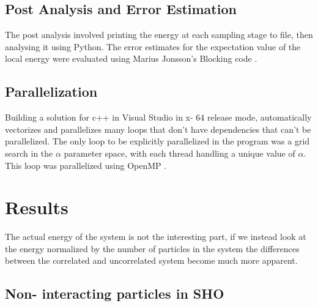 \documentclass[11pt,a4paper,titlepage]{article}
\begin{document}
\subsection{Post Analysis and Error Estimation}
The post analysis involved printing the energy at each sampling stage to file, then analysing it using Python. The error estimates for the expectation value of the local energy were evaluated using Marius Jonsson's Blocking code \cite{PhysRevE.98.043304}.
\subsection{Parallelization}
Building a solution for c++ in Visual Studio in x- 64 release mode, automatically vectorizes and parallelizes many loops that don't have dependencies that can't be parallelized. The only loop to be explicitly parallelized in the program was a grid search in the $\alpha$ parameter space, with each thread handling a unique value of $\alpha$. This loop was parallelized using OpenMP \cite{openmp08}.
\section{Results}
The actual energy of the system is not the interesting part, if we instead look at the energy normalized by the number of particles in the system the differences between the correlated and uncorrelated system become much more apparent.
\subsection{Non- interacting particles in SHO}
\end{document}
